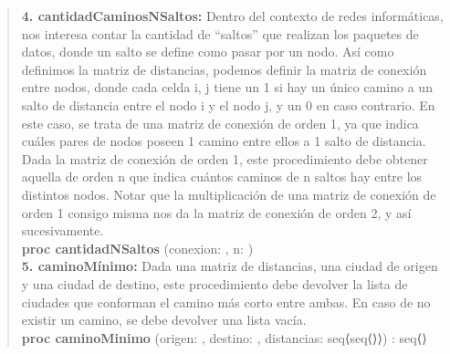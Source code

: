 \documentclass[10pt,a4paper]{article}
\begin{document}
\begin{quote}
	\textbf{4. cantidadCaminosNSaltos:} Dentro del contexto de redes informáticas, nos interesa contar la cantidad de “saltos” que realizan los paquetes de datos, donde un salto se define como pasar por un nodo.  
	Así como definimos la matriz de distancias, podemos definir la matriz de conexión entre nodos, donde cada celda i, j tiene un 1 si hay un único camino a un salto de distancia entre el nodo i y el nodo j, y un 0 en caso contrario. En este caso, se trata de una matriz de conexión de orden 1, ya que indica cuáles pares de nodos poseen 1 camino entre ellos a 1 salto de distancia.  
	Dada la matriz de conexión de orden 1, este procedimiento debe obtener aquella de orden n que indica cuántos caminos de n saltos hay entre los distintos nodos. Notar que la multiplicación de una matriz de conexión de orden 1 consigo misma nos da la matriz de conexión de orden 2, y así sucesivamente.
	\\
	\vspace{0.2cm}
	\textbf{proc cantidadNSaltos} (\Inout conexion: \matriz{\ent}, \In n: \ent)
	\vspace{0.2cm}
	\\
	\vspace{0.2cm}
	\textbf{5. caminoMínimo:} Dada una matriz de distancias, una ciudad de origen y una ciudad de destino, este procedimiento debe devolver la lista de ciudades que conforman el camino más corto entre ambas. En caso de no existir un camino, se debe devolver una lista vacía.
	\\
	\textbf{proc caminoMinimo} (\In origen: \ent, \In destino: \ent, \In distancias: seq⟨seq⟨\ent⟩⟩) : seq⟨\ent⟩
\end{quote}
\end{document}
